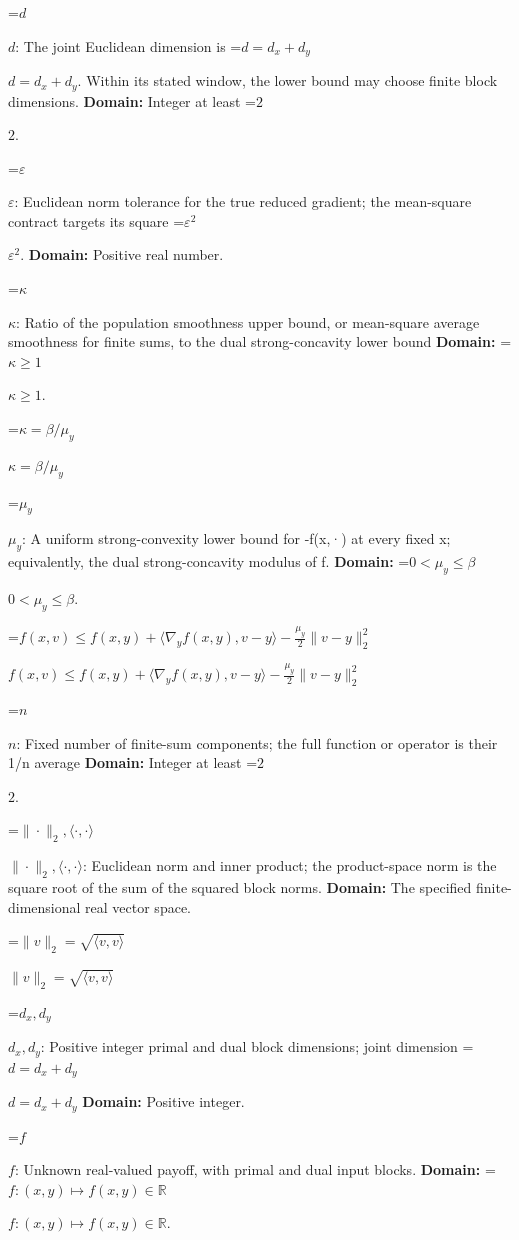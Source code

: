 \documentclass[10pt,a4paper]{article}
\newcommand{\AtlasMath}[1]{\par\begingroup\centering\setbox0=\hbox{$\displaystyle #1$}\ifdim\wd0>1.4\linewidth\typeout{ATLAS WIDE FORMULA: \the\wd0}\fi\ifdim\wd0>\linewidth\resizebox{\linewidth}{!}{\box0}\else\box0\fi\par\endgroup}
\newcommand{\AtlasInlineMath}[1]{\begingroup\setbox0=\hbox{$#1$}\ifdim\wd0>.4\linewidth\endgroup\AtlasMath{#1}\else\endgroup$#1$\fi}
\begin{document}
\AtlasInlineMath{d}: The joint Euclidean dimension is \AtlasInlineMath{d=d_x+d_y}. Within its stated window, the lower bound may choose finite block dimensions. \textbf{Domain:} Integer at least \AtlasInlineMath{2}.



\AtlasInlineMath{\varepsilon}: Euclidean norm tolerance for the true reduced gradient; the mean-square contract targets its square \AtlasInlineMath{\varepsilon^2}. \textbf{Domain:} Positive real number.



\AtlasInlineMath{\kappa}: Ratio of the population smoothness upper bound, or mean-square average smoothness for finite sums, to the dual strong-concavity lower bound \textbf{Domain:} \AtlasInlineMath{\kappa\ge1}.



\AtlasInlineMath{\kappa=\beta/\mu_y}



\AtlasInlineMath{\mu_y}: A uniform strong-convexity lower bound for -f(x,·) at every fixed x; equivalently, the dual strong-concavity modulus of f. \textbf{Domain:} \AtlasInlineMath{0<\mu_y\le\beta}.



\AtlasInlineMath{f(x,v)\le f(x,y)+\langle\nabla_yf(x,y),v-y\rangle-\frac{\mu_y}{2}\|v-y\|_2^2}



\AtlasInlineMath{n}: Fixed number of finite-sum components; the full function or operator is their 1/n average \textbf{Domain:} Integer at least \AtlasInlineMath{2}.



\AtlasInlineMath{\|\cdot\|_2,\langle\cdot,\cdot\rangle}: Euclidean norm and inner product; the product-space norm is the square root of the sum of the squared block norms. \textbf{Domain:} The specified finite-dimensional real vector space.



\AtlasInlineMath{\|v\|_2=\sqrt{\langle v,v\rangle}}



\AtlasInlineMath{d_x,d_y}: Positive integer primal and dual block dimensions; joint dimension \AtlasInlineMath{d=d_x+d_y} \textbf{Domain:} Positive integer.



\AtlasInlineMath{f}: Unknown real-valued payoff, with primal and dual input blocks. \textbf{Domain:} \AtlasInlineMath{f:(x,y)\mapsto f(x,y)\in\mathbb R}.
\end{document}
